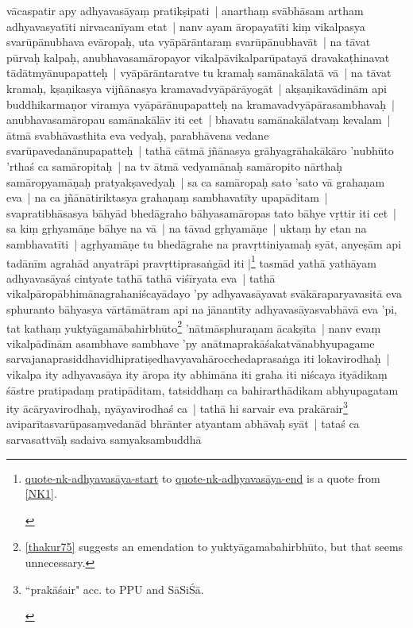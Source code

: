 \documentclass[article,a4paper]{memoir}
\newcommand{\persName}[1]{#1}
\begin{document}
	  \pstart \persName{vā\-caspatir} apy adhyavasā\-yaṃ pratikṣipati | \label{quote-nk-adhyavasāya-start} anarthaṃ svā\-bhā\-sam artham adhyavasyatī\-ti nirvacanī\-yam etat | nanv ayam ā\-ropayatī\-ti kiṃ vikalpasya svarū\-pā\-nubhava evā\-ropaḥ, uta vyā\-pā\-rā\-ntaraṃ svarū\-pā\-nubhavā\-t | na tā\-vat pū\-rvaḥ kalpaḥ, anubhavasamā\-ropayor vikalpā\-vikalparū\-patayā\- dravakaṭhinavat tā\-dā\-tmyā\-nupapatteḥ | vyā\-pā\-rā\-ntaratve tu kramaḥ samā\-nakā\-latā\- vā\- | na tā\-vat kramaḥ, kṣaṇikasya vijñā\-nasya kramavadvyā\-pā\-rā\-yogā\-t | akṣaṇikavā\-dinā\-m api buddhikarmaṇor viramya vyā\-pā\-rā\-nupapatteḥ na kramavadvyā\-pā\-rasambhavaḥ | anubhavasamā\-ropau samā\-nakā\-lā\-v iti cet | bhavatu samā\-nakā\-latvaṃ kevalam | ā\-tmā\- svabhā\-vasthita eva vedyaḥ, parabhā\-vena vedane svarū\-pavedanā\-nupapatteḥ | tathā\- cā\-tmā\- jñā\-nasya grā\-hyagrā\-hakā\-kā\-ro 'nubhū\-to 'rthaś ca samā\-ropitaḥ | na tv ā\-tmā\- vedyamā\-naḥ samā\-ropito nā\-rthaḥ samā\-ropyamā\-ṇaḥ pratyakṣavedyaḥ | sa ca samā\-ropaḥ sato 'sato vā\- grahaṇam eva | na ca jñā\-nā\-tiriktasya grahaṇaṃ sambhavatī\-ty upapā\-ditam |\label{thakur75-135.27} svapratibhā\-sasya bā\-hyā\-d bhedā\-graho bā\-hyasamā\-ropas tato bā\-hye vṛttir iti cet | sa kiṃ gṛhyamā\-ṇe bā\-hye na vā\- | na tā\-vad gṛhyamā\-ṇe | uktaṃ hy etan na  sambhavatī\-ti | agṛhyamā\-ṇe tu bhedā\-grahe na pravṛttiniyamaḥ syā\-t, anyeṣā\-m api tadā\-nī\-m agrahā\-d anyatrā\-pi pravṛttiprasaṅgā\-d iti \label{quote-nk-adhyavasāya-end}|\footnote{\begin{english}\href{quote-nk-adhyavasāya-start}{quote-nk-adhyavasā\-ya-start} to \href{quote-nk-adhyavasāya-end}{quote-nk-adhyavasā\-ya-end} is a quote from \cref{NK1}.\end{english}} tasmā\-d yathā\- yathā\-yam adhyavasā\-yaś cintyate tathā\- tathā\- viśī\-ryata eva | tathā\- vikalpā\-ropā\-bhimā\-nagrahaniścayā\-dayo 'py adhyavasā\-yavat svā\-kā\-raparyavasitā\- eva sphuranto bā\-hyasya vā\-rtā\-mā\-tram api na jā\-nantī\-ty adhyavasā\-yasvabhā\-vā\- eva  'pi, tat kathaṃ yuktyā\-gamā\-bahirbhū\-to\footnote{\cref{thakur75} suggests an emendation to yuktyā\-gamabahirbhū\-to, but that seems unnecessary.} 'nā\-tmā\-sphuraṇam ā\-cakṣī\-ta | \label{thakur75-136.3} nanv evaṃ vikalpā\-dī\-nā\-m asambhave sambhave 'py anā\-tmaprakā\-śakatvā\-nabhyupagame sarvajanaprasiddhavidhipratiṣedhavyavahā\-rocchedaprasaṅga iti lokavirodhaḥ | vikalpa ity adhyavasā\-ya ity ā\-ropa ity abhimā\-na iti graha iti niścaya ityā\-dikaṃ śā\-stre pratipadaṃ pratipā\-ditam, tatsiddhaṃ ca bahirarthā\-dikam abhyupagatam ity ā\-cā\-ryavirodhaḥ, nyā\-yavirodhaś ca | tathā\- hi sarvair eva prakā\-rair\footnote{\begin{english}``prakā\-śair" acc. to PPU and Sā\-SiŚā\-.\end{english}} aviparī\-tasvarū\-pasaṃvedanā\-d bhrā\-nter atyantam abhā\-vaḥ syā\-t | tataś ca sarvasattvā\-ḥ sadaiva samyaksambuddhā\- 
\end{document}
